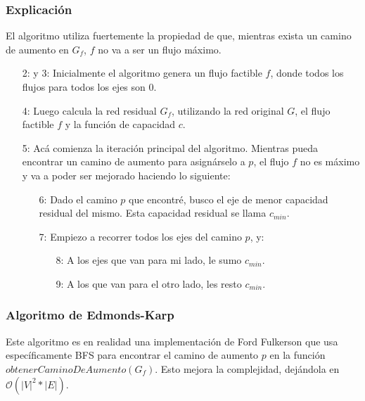 \subsubsection*{Explicaci\'on}

El algoritmo utiliza fuertemente la propiedad de que, mientras exista un camino de aumento en $G_f$, $f$ no va a ser un flujo m\'aximo. 

\begin{enumerate}
\item [2: y 3:] Inicialmente el algoritmo genera un flujo factible $f$, donde todos los flujos para todos los ejes son $0$.
\item [4:] Luego calcula la red residual $G_f$, utilizando la red original $G$, el flujo factible $f$ y la funci\'on de capacidad $c$.
\item [5:] Ac\'a comienza la iteraci\'on principal del algoritmo. Mientras pueda encontrar un camino de aumento para asign\'arselo a $p$, el flujo $f$ no es m\'aximo y va a poder ser mejorado haciendo lo siguiente:
  \begin{enumerate}
  \item [6:] Dado el camino $p$ que encontr\'e, busco el eje de menor capacidad residual del mismo. Esta capacidad residual se llama $c_{min}$.
  \item [7:] Empiezo a recorrer todos los ejes del camino $p$, y:
    \begin{enumerate}
      \item [8:] A los ejes que van para mi lado, le sumo $c_{min}$.
      \item [9:] A los que van para el otro lado, les resto $c_{min}$.
    \end{enumerate}
  \end{enumerate}
\end{enumerate}

\subsubsection{Algoritmo de Edmonds-Karp}

Este algoritmo es en realidad una implementaci\'on de Ford Fulkerson que usa espec\'ificamente BFS para encontrar el camino de aumento $p$ en la funci\'on $obtenerCaminoDeAumento(G_f)$. Esto mejora la complejidad, dej\'andola en $\mathcal{O}(|V|^2 * |E|)$.

